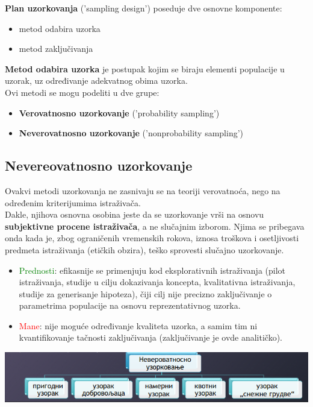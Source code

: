 \documentclass[10pt,a4paper,]{article}
\begin{document}
\textbf{Plan uzorkovanja} ('sampling design') poseduje dve osnovne 
komponente: 
	\begin{itemize}
		\item metod odabira uzorka
		\item metod zaključivanja
	\end{itemize}
\textbf{Metod odabira uzorka} je postupak kojim se biraju elementi
populacije u uzorak, uz određivanje adekvatnog obima uzorka.
\\
Ovi metodi se mogu podeliti u dve grupe:
	\begin{itemize}
		\item \textbf{Verovatnosno uzorkovanje} 
		('probability sampling')
		\item \textbf{Neverovatnosno uzorkovanje}
		('nonprobability sampling')
	\end{itemize}	
	
	
\subsection{Nevereovatnosno uzorkovanje}
Ovakvi metodi uzorkovanja ne zasnivaju se na teoriji verovatnoća, 
nego na određenim kriterijumima istraživača. 
\\
Dakle, njihova osnovna 
osobina jeste da se uzorkovanje vrši na osnovu 
\textbf{subjektivne procene 
istraživača}, a ne slučajnim izborom. Njima se pribegava onda kada je, 
zbog ograničenih vremenskih rokova, iznosa troškova i osetljivosti 
predmeta istraživanja (etičkih obzira), teško sprovesti slučajno 
uzorkovanje.

\begin{itemize}
	\item \textcolor{green}{Prednosti}:
	efikasnije se primenjuju kod eksplorativnih istraživanja (pilot 	
	istraživanja, studije u cilju dokazivanja koncepta, kvalitativna 
	istraživanja, studije za generisanje hipoteza), čiji cilj nije 
	precizno zaključivanje o parametrima populacije na osnovu 
	reprezentativnog uzorka.
	\item \textcolor{red}{Mane}:
	nije moguće određivanje kvaliteta uzorka, a samim tim ni 
	kvantifikovanje tačnosti zaključivanja (zaključivanje je ovde 
	analitičko).
\end{itemize}
\includegraphics[scale=0.5]{primer5}
\end{document}
